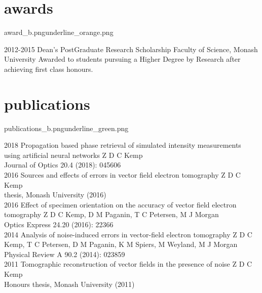 \documentclass[a4paper]{friggeri-cv} %
\newcommand{\spacer}{\vspace{0.0cm}}
\begin{document}
\section{awards}{award_b.png}{underline_orange.png}

\begin{entrylist}


\entry
{2012-2015\phantom{XXX}}
{Dean's PostGraduate Research Scholarship}
{Faculty of Science, Monash University}
{Awarded to students pursuing a Higher Degree by Research after achieving first class honours.}


\end{entrylist}


\newpage
{}

\spacer
\section{publications}{publications_b.png}{underline_green.png}
\begin{entrylist}
\entry
{2018}
{Propagation based phase retrieval of simulated intensity measurements using artificial neural networks}
{}
{Z D C Kemp\\ Journal of Optics 20.4 (2018): 045606\\}
\entry
{2016}
{Sources and effects of errors in vector field electron tomography}
{}
{Z D C Kemp\\ \phd{} thesis, Monash University (2016)\\}
\entry
{2016}
{Effect of specimen orientation on the accuracy of vector field electron tomography}
{}
{Z D C Kemp, D M Paganin, T C Petersen, M J Morgan\\Optics Express 24.20 (2016): 22366\\}
\entry
{2014}
{Analysis of noise-induced errors in vector-field electron tomography}
{}
{Z D C Kemp, T C Petersen, D M Paganin, K M Spiers, M Weyland, M J Morgan\\Physical Review A 90.2 (2014): 023859\\}
\entry
{2011}
{Tomographic reconstruction of vector fields in the presence of noise}
{}
{Z D C Kemp\\ Honours thesis, Monash University (2011)\\}
\end{entrylist}
\end{document}
